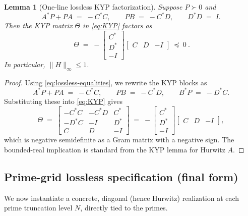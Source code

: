 \documentclass[11pt]{article}
\newtheorem{lemma}[theorem]{Lemma}
\theoremstyle{definition}
\theoremstyle{remark}
\begin{document}
\begin{lemma}[One-line lossless KYP factorization]\label{lem:losslessKYP}
Suppose \(P\succ 0\) and
\begin{equation}\label{eq:lossless-equalities}
 A^*P+PA\;=\;-C^*C,\qquad PB\;=\;-C^*D,\qquad D^*D\;=\;I.
\end{equation}
Then the KYP matrix \(\Theta\) in \eqref{eq:KYP} factors as
\begin{equation}\label{eq:one-line-factor}
 \boxed{\ \Theta\;=\;-\begin{bmatrix}C^*\\ D^*\\ -I\end{bmatrix}\!\begin{bmatrix}C & D & -I\end{bmatrix}\ \preceq\ 0\ }.
\end{equation}
In particular, \(\|H\|_\infty\le 1\).
\end{lemma}
\begin{proof}
Using \eqref{eq:lossless-equalities}, we rewrite the KYP blocks as
\[
 A^*P+PA\;=\;-C^*C,\qquad PB\;=\;-C^*D,\qquad B^*P\;=\;-D^*C.
\]
Substituting these into \eqref{eq:KYP} gives
\[
 \Theta\;=\;\begin{bmatrix}
  -C^*C & -C^*D & C^*\\
  -D^*C & -I & D^*\\
  C & D & -I
 \end{bmatrix}\;=\;-\begin{bmatrix}C^*\\ D^*\\ -I\end{bmatrix}\!\begin{bmatrix}C & D & -I\end{bmatrix},
\]
which is negative semidefinite as a Gram matrix with a negative sign. The bounded-real implication is standard from the KYP lemma for Hurwitz \(A\).
\end{proof}

\subsection{Prime-grid lossless specification (final form)}
We now instantiate a concrete, diagonal (hence Hurwitz) realization at each prime truncation level \(N\), directly tied to the primes.
\end{document}
